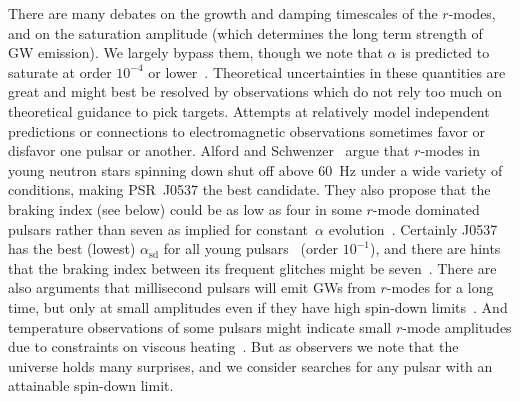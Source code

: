 \documentclass{ttuthes2007}
\begin{document}
There are many debates on the growth and damping timescales of the $r$-modes,
and on the saturation amplitude (which determines the long term strength of
\ac{GW} emission).
We largely bypass them, though we note that $\alpha$ is predicted to saturate
at order $10^{-4}$ or lower~\cite{Arras:2002dw}.
Theoretical uncertainties in these quantities are great and might best be
resolved by observations which do not rely too much on theoretical guidance to
pick targets.
Attempts at relatively model independent predictions or connections to
electromagnetic observations sometimes favor or disfavor one pulsar or
another.
Alford and Schwenzer~\cite{Alford:2012yn} argue that $r$-modes in young
neutron stars spinning down shut off above 60~Hz under a wide variety of
conditions, making PSR~J0537 the best candidate.
They also propose that the braking index (see below) could be as low as four
in some $r$-mode dominated pulsars rather than seven as implied for
constant~$\alpha$ evolution~\cite{Owen:1998xg}.
Certainly J0537 has the best (lowest)
$\alpha_\mathrm{sd}$ for all young pulsars~\cite{Owen:2010ng} (order
$10^{-1}$), and there are hints that the braking index between its frequent
glitches might be seven~\cite{Andersson:2017fow}.
There are also arguments that millisecond pulsars will emit \acp{GW} from
$r$-modes for a long time, but only at small amplitudes even if they have high
spin-down limits~\cite{Bondarescu:2013xwa, Alford:2014pxa}.
And temperature observations of some pulsars might indicate small $r$-mode
amplitudes due to constraints on viscous heating~\cite{Schwenzer:2016tkf}.
But as observers we note that the universe holds many surprises, and we
consider searches for any pulsar with an attainable spin-down limit.
\end{document}
